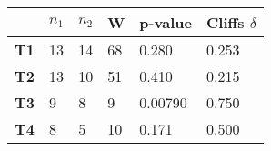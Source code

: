 \begin{tabular}{llllll}
\hline
            & \textbf{$n_1$} & \textbf{$n_2$} & \textbf{W} & \textbf{p-value} & \textbf{Cliffs $\delta$} \\ \hline
\textbf{T1} & 13                      & 14    & 68        & 0.280           & 0.253     \\
\textbf{T2} & 13                      & 10    & 51        & 0.410           & 0.215     \\
\textbf{T3} & 9                       & 8     & 9         & 0.00790         & 0.750     \\
\textbf{T4} & 8                       & 5     & 10        & 0.171           & 0.500     \\ \hline
\end{tabular}
